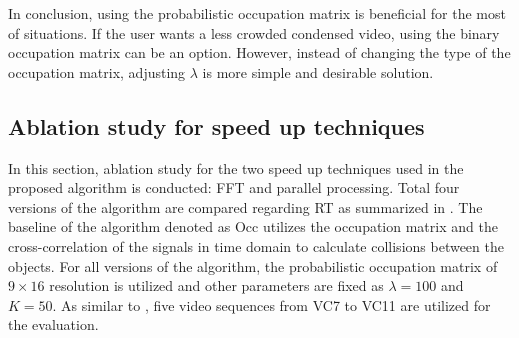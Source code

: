 \documentclass[11pt]{hyu_thesis}
\begin{document}
In conclusion, using the probabilistic occupation matrix is beneficial for the most of situations. If the user wants a less crowded condensed video, using the binary occupation matrix can be an option. However, instead of changing the type of the occupation matrix, adjusting $\lambda$ is more simple and desirable solution.

\subsection{Ablation study for speed up techniques}
\label{sec:exp:parallel}
In this section, ablation study for the two speed up techniques used in the proposed algorithm is conducted: FFT and parallel processing. Total four versions of the algorithm are compared regarding RT as summarized in . The baseline of the algorithm denoted as Occ utilizes the occupation matrix and the cross-correlation of the signals in time domain to calculate collisions between the objects. For all versions of the algorithm, the probabilistic occupation matrix of $9\times16$ resolution is utilized and other parameters are fixed as $\lambda=100$ and $K=50$. As similar to , five video sequences from VC7 to VC11 are utilized for the evaluation.
\end{document}
